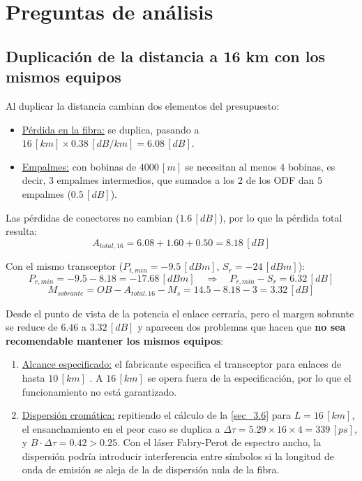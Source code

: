\section{Preguntas de análisis}
\label{sec_5}

\subsection{Duplicación de la distancia a 16 km con los mismos equipos}
\label{sec_5.1}
Al duplicar la distancia cambian dos elementos del presupuesto:
\begin{itemize}
    \item \underline{Pérdida en la fibra:} se duplica, pasando a $16 \, [km] \times 0.38 \, [dB/km] = 6.08 \, [dB]$.
    \item \underline{Empalmes:} con bobinas de $4000 \, [m]$ se necesitan al menos $4$ bobinas, es decir, $3$ empalmes intermedios, que sumados a los $2$ de los ODF dan $5$ empalmes ($0.5 \, [dB]$).
\end{itemize}

Las pérdidas de conectores no cambian ($1.6 \, [dB]$), por lo que la pérdida total resulta:
\begin{equation}
    A_{total,16} = 6.08 + 1.60 + 0.50 = 8.18 \, [dB]
    \label{eq_d1}
\end{equation}

Con el mismo transceptor ($P_{t,min} = -9.5 \, [dBm]$, $S_r = -24 \, [dBm]$):
\begin{equation}
    P_{r,min} = -9.5 - 8.18 = -17.68 \, [dBm] \quad \Rightarrow \quad P_{r,min} - S_{r} = 6.32 \, [dB]
    \label{eq_d2}
\end{equation}
\begin{equation}
    M_{sobrante} = OB - A_{total,16} - M_s = 14.5 - 8.18 - 3 = 3.32 \, [dB]
    \label{eq_d3}
\end{equation}

Desde el punto de vista de la potencia el enlace cerraría, pero el margen sobrante se reduce de $6.46$ a $3.32 \, [dB]$ y aparecen dos problemas que hacen que \textbf{no sea recomendable mantener los mismos equipos}:
\begin{enumerate}
    \item \underline{Alcance especificado:} el fabricante especifica el transceptor para enlaces de hasta $10 \, [km]$ \cite{b1}. A $16 \, [km]$ se opera fuera de la especificación, por lo que el funcionamiento no está garantizado.
    \item \underline{Dispersión cromática:} repitiendo el cálculo de la \autoref{sec_3.6} para $L = 16 \, [km]$, el ensanchamiento en el peor caso se duplica a $\Delta\tau = 5.29 \times 16 \times 4 = 339 \, [ps]$, y $B \cdot \Delta\tau = 0.42 > 0.25$. Con el láser Fabry-Perot de espectro ancho, la dispersión podría introducir interferencia entre símbolos si la longitud de onda de emisión se aleja de la de dispersión nula de la fibra.
\end{enumerate}

